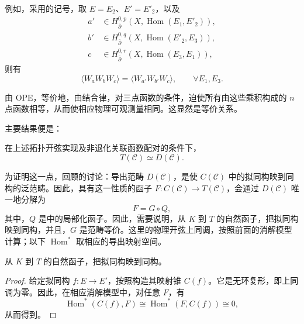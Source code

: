 \begin{example*}
例如，采用的记号，取 $E=E_2$、$E'=E'_2$，以及
\begin{equation}\label{eq:5.58}
\begin{aligned}
a'&\in H_{\bar\partial}^{0,p}(X,\operatorname{Hom}(E_1,E'_2)),\\
b'&\in H_{\bar\partial}^{0,q}(X,\operatorname{Hom}(E'_2,E_3)),\\
c&\in H_{\bar\partial}^{0,r}(X,\operatorname{Hom}(E_3,E_1)),
\end{aligned}
\end{equation}
则有
\[
\langle W_aW_bW_c\rangle
=\langle W_{a'}W_{b'}W_c\rangle,\qquad\forall E_1,E_3.
\]
\end{example*}
由 OPE，等价地，由结合律，对三点函数的条件，迫使所有由这些乘积构成的 $n$ 点函数相等，从而使相应物理可观测量相同。这显然是等价关系。

主要结果便是：
\begin{theorem}\label{thm:5.14}
在上述拓扑开弦实现及非退化关联函数配对的条件下，
\[
T(\mathcal{C})\simeq D(\mathcal{C}).
\]
\end{theorem}

为证明这一点，回顾的讨论：导出范畴 $D(\mathcal{C})$，是使 $C(\mathcal{C})$ 中的拟同构映到同构的泛范畴。因此，具有这一性质的函子 $F\colon C(\mathcal{C})\to T(\mathcal{C})$，会通过 $D(\mathcal{C})$ 唯一地分解为
\[
F=G\circ Q,
\]
其中，$Q$ 是中的局部化函子。因此，需要说明，从 $K$ 到 $T$ 的自然函子，把拟同构映到同构，并且，$G$ 是范畴等价。这里的物理开弦上同调，按照前面的消解模型计算；以下 $\operatorname{Hom}^*$ 取相应的导出映射空间。

\begin{proposition}\label{prop:5.15}
从 $K$ 到 $T$ 的自然函子，把拟同构映到同构。
\end{proposition}
\begin{proof}
给定拟同构 $f\colon E\to E'$，按照构造其映射锥 $C(f)$。它是无环复形，即上同调为零。因此，在相应消解模型中，对任意 $F$，有
\[
\operatorname{Hom}^*(C(f),F)
\cong\operatorname{Hom}^*(F,C(f))\cong0,
\]
从而得到。
\end{proof}

